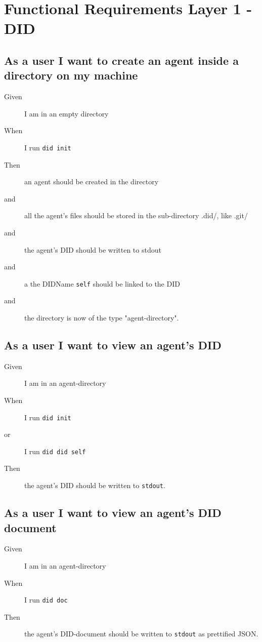 \newpage

\section{Functional Requirements Layer 1 - DID}


\subsection{As a user I want to create an agent inside a directory on my machine}
\begin{description}\begin{description}
    \item[Given] I am in an empty directory
    \item[When] I run \texttt{did init}
    \item[Then] an agent should be created in the directory
    \item[and] all the agent's files should be stored in the sub-directory .did/, like .git/
    \item[and] the agent's DID should be written to stdout 
    \item[and] a the DIDName \texttt{self} should be linked to the DID
    \item[and] the directory is now of the type "agent-directory".
\end{description}\end{description}


\subsection{As a user I want to view an agent's DID}
\begin{description}\begin{description}
    \item[Given] I am in an agent-directory
    \item[When] I run \texttt{did init}
    \item[or] I run \texttt{did did self}
    \item[Then] the agent's DID should be written to \texttt{stdout}.
\end{description}\end{description}


\subsection{As a user I want to view an agent's DID document}
\begin{description}\begin{description}
    \item[Given] I am in an agent-directory
    \item[When] I run \texttt{did doc}
    \item[Then] the agent's DID-document should be written to \texttt{stdout} as prettified JSON.
\end{description}\end{description}


